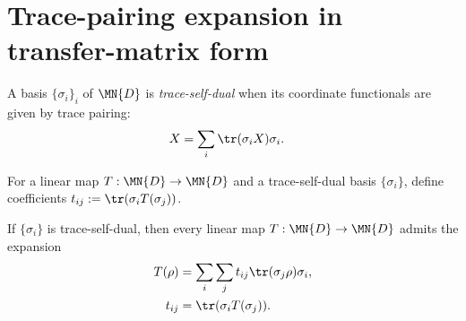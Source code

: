 \section{Trace-pairing expansion in transfer-matrix form}
\label{sec:trace_pairing_expansion}


\begin{definition}\label{def:trace_pairing_self_dual_basis}
    \leanok
    A basis $\{\sigma_i\}_i$ of $\MN{D}$ is \emph{trace-self-dual} when
    its coordinate functionals are given by trace pairing:
    \begin{align}
        X &= \sum_i \tr(\sigma_i X)\sigma_i.
        \label{eq:representations_self_dual}
    \end{align}
\end{definition}

\begin{definition}\label{def:trace_pairing_coeff}
    \leanok
    For a linear map $T : \MN{D} \to \MN{D}$ and a trace-self-dual basis
    $\{\sigma_i\}$, define coefficients
    $t_{ij}:=\tr(\sigma_i T(\sigma_j))$.
\end{definition}

\begin{theorem}\label{thm:linearMap_expand_tracePairing}
    \leanok
    If $\{\sigma_i\}$ is trace-self-dual, then every linear map
    $T : \MN{D} \to \MN{D}$ admits the expansion
    \begin{align}
        T(\rho)
        &= \sum_i \sum_j t_{ij}\tr(\sigma_j\rho)\sigma_i,
        \label{eq:representations_trace_expansion}\\
        t_{ij}
        &= \tr(\sigma_i T(\sigma_j)).
        \notag
    \end{align}
\end{theorem}

